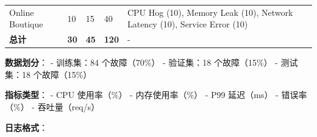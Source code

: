 \begin{longtable}[]{@{}lllll@{}}
\begin{minipage}[t]{0.10\columnwidth}\raggedright
Online Boutique\strut
\end{minipage} & \begin{minipage}[t]{0.14\columnwidth}\raggedright
10\strut
\end{minipage} & \begin{minipage}[t]{0.17\columnwidth}\raggedright
15\strut
\end{minipage} & \begin{minipage}[t]{0.21\columnwidth}\raggedright
40\strut
\end{minipage} & \begin{minipage}[t]{0.24\columnwidth}\raggedright
CPU Hog (10), Memory Leak (10), Network Latency (10), Service Error
(10)\strut
\end{minipage}\tabularnewline
\begin{minipage}[t]{0.10\columnwidth}\raggedright
\textbf{总计}\strut
\end{minipage} & \begin{minipage}[t]{0.14\columnwidth}\raggedright
\textbf{30}\strut
\end{minipage} & \begin{minipage}[t]{0.17\columnwidth}\raggedright
\textbf{45}\strut
\end{minipage} & \begin{minipage}[t]{0.21\columnwidth}\raggedright
\textbf{120}\strut
\end{minipage} & \begin{minipage}[t]{0.24\columnwidth}\raggedright
-\strut
\end{minipage}\tabularnewline
\bottomrule
\end{longtable}

\textbf{数据划分}： - 训练集：84 个故障（70\%） - 验证集：18
个故障（15\%） - 测试集：18 个故障（15\%）

\textbf{指标类型}： - CPU 使用率（\%） - 内存使用率（\%） - P99
延迟（ms） - 错误率（\%） - 吞吐量（req/s）

\textbf{日志格式}：

\begin{Shaded}
\begin{Highlighting}[]
\FunctionTok{\{}
  \FunctionTok{:} \FunctionTok{,}
  \FunctionTok{:} \FunctionTok{,}
  \FunctionTok{:} \FunctionTok{,}
  \FunctionTok{:} 
\FunctionTok{\}}
\end{Highlighting}
\end{Shaded}

